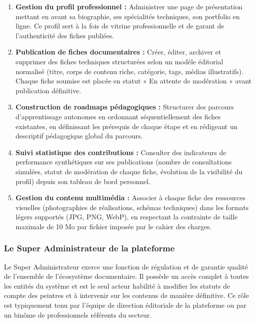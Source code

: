 \documentclass[12pt,a4paper]{report}
\begin{document}
\begin{enumerate}[leftmargin=1.5cm, label=\textbf{BF-\arabic*.}, itemsep=5pt]
    \item \textbf{Gestion du profil professionnel :} Administrer une page de présentation mettant en avant sa biographie, ses spécialités techniques, son portfolio en ligne. Ce profil sert à la fois de vitrine professionnelle et de garant de l'authenticité des fiches publiées.
    \item \textbf{Publication de fiches documentaires :} Créer, éditer, archiver et supprimer des fiches techniques structurées selon un modèle éditorial normalisé (titre, corps de contenu riche, catégorie, tags, médias illustratifs). Chaque fiche soumise est placée en statut « En attente de modération » avant publication définitive.
    \item \textbf{Construction de roadmaps pédagogiques :} Structurer des parcours d'apprentissage autonomes en ordonnant séquentiellement des fiches existantes, en définissant les prérequis de chaque étape et en rédigeant un descriptif pédagogique global du parcours.
    \item \textbf{Suivi statistique des contributions :} Consulter des indicateurs de performance synthétiques sur ses publications (nombre de consultations simulées, statut de modération de chaque fiche, évolution de la visibilité du profil) depuis son tableau de bord personnel.
    \item \textbf{Gestion du contenu multimédia :} Associer à chaque fiche des ressources visuelles (photographies de réalisations, schémas techniques) dans les formats légers supportés (JPG, PNG, WebP), en respectant la contrainte de taille maximale de 10 Mo par fichier imposée par le cahier des charges.
\end{enumerate}

\subsubsection*{Le Super Administrateur de la plateforme}

\noindent
Le Super Administrateur exerce une fonction de régulation et de garantie qualité de l'ensemble de l'écosystème documentaire. Il possède un accès complet à toutes les entités du système et est le seul acteur habilité à modifier les statuts de compte des peintres et à intervenir sur les contenus de manière définitive. Ce rôle est typiquement tenu par l'équipe de direction éditoriale de la plateforme ou par un binôme de professionnels référents du secteur.
\end{document}
